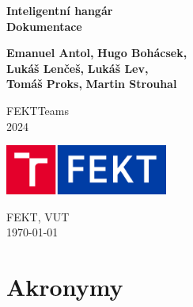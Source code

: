 \documentclass[a4paper]{article}
\begin{document}
\begin{titlepage}
    \begin{center}
        \vspace*{1cm}
            
        \Huge
        \textbf{Inteligentní hangár}\\
        \Large
        \textbf{Dokumentace}
            
        \vspace{0.5cm}
        \LARGE
            
        \vspace{1.5cm}
            
        \textbf{Emanuel Antol,}
        \textbf{Hugo Bohácsek,}\\
        \textbf{Lukáš Lenčeš,}
        \textbf{Lukáš Lev,}\\
        \textbf{Tomáš Proks,}
        \textbf{Martin Strouhal}
            
        \vfill
            
        FEKTTeams\\
        2024
            
        \vspace{0.8cm}
            
        \includegraphics[width=0.4\textwidth]{pics/FEKT_zkratka_logo_RGB_CZ (1).png}
            
        \Large
        FEKT, VUT\\
        \today
    \end{center}
\end{titlepage}
\newpage


%    

\tableofcontents

\section{Akronymy}
\begin{acronym}
\end{acronym}
\newpage
\end{document}

